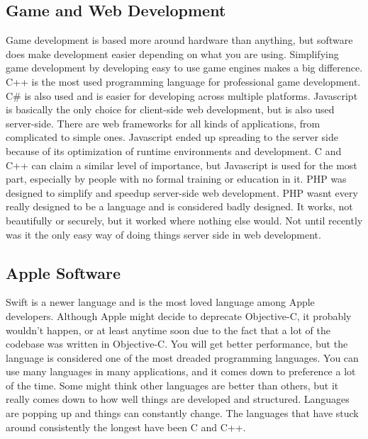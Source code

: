 \documentclass[letterpaper, 10 pt, conference]{IEEEtran}
\begin{document}
\subsection{Game and Web Development}
\indent Game development is based more around hardware than anything, but software does make development easier depending on what you are using. Simplifying game development by developing easy to use game engines makes a big difference. C++ is the most used programming language for professional game development. C\# is also used and is easier for developing across multiple platforms.  Javascript is basically the only choice for client-side web development, but is also used server-side. There are web frameworks for all kinds of applications, from complicated to simple ones. Javascript ended up spreading to the server side because of its optimization of runtime environments and development. C and C++ can claim a similar level of importance, but Javascript is used for the most part, especially by people with no formal training or education in it. PHP was designed to simplify and speedup server-side web development. PHP wasnt every really designed to be a language and is considered badly designed. It works, not beautifully or securely, but it worked where nothing else would. Not until recently was it the only easy way of doing things server side in web development.
\newline
\subsection{Apple Software}
\indent Swift is a newer language and is the most loved language among Apple developers. Although Apple might decide to deprecate  Objective-C, it probably wouldn't happen, or at least anytime soon due to the fact that a lot of the codebase was written in Objective-C. You will get better performance, but the language is considered one of the most dreaded programming languages.
\newline
\indent You can use many languages in many applications, and it comes down to preference a lot of the time. Some might think other languages are better than others, but it really comes down to how well things are developed and structured. Languages are popping up and things can constantly change. The languages that have stuck around consistently the longest have been C and C++.
\end{document}

